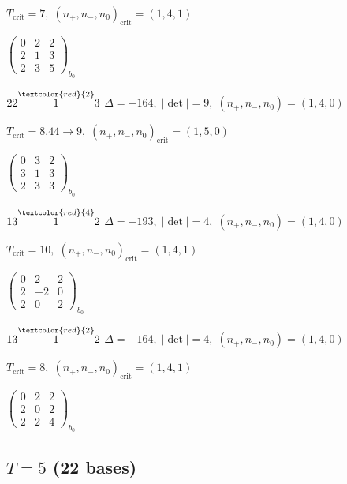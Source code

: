 \documentclass[10pt]{article}
\begin{document}
\hspace{1em}$T_{\text{crit}}=7,\; (n_+,n_-,n_0)_{\text{crit}}=(1,4,1)$

\hspace{2em}$\left(\begin{smallmatrix}0 & 2 & 2 \\ 2 & 1 & 3 \\ 2 & 3 & 5\end{smallmatrix}\right)_{\!b_0}$

\smallskip

$22\overset{\textcolor{red}{2}}{1}3$ \quad $\Delta=-164,\; |\det|=9,\; (n_+,n_-,n_0)=(1,4,0)$

\hspace{1em}$T_{\text{crit}}=8.44 \to 9,\; (n_+,n_-,n_0)_{\text{crit}}=(1,5,0)$

\hspace{2em}$\left(\begin{smallmatrix}0 & 3 & 2 \\ 3 & 1 & 3 \\ 2 & 3 & 3\end{smallmatrix}\right)_{\!b_0}$

\smallskip

$13\overset{\textcolor{red}{4}}{1}2$ \quad $\Delta=-193,\; |\det|=4,\; (n_+,n_-,n_0)=(1,4,0)$

\hspace{1em}$T_{\text{crit}}=10,\; (n_+,n_-,n_0)_{\text{crit}}=(1,4,1)$

\hspace{2em}$\left(\begin{smallmatrix}0 & 2 & 2 \\ 2 & -2 & 0 \\ 2 & 0 & 2\end{smallmatrix}\right)_{\!b_0}$

$13\overset{\textcolor{red}{2}}{1}2$ \quad $\Delta=-164,\; |\det|=4,\; (n_+,n_-,n_0)=(1,4,0)$

\hspace{1em}$T_{\text{crit}}=8,\; (n_+,n_-,n_0)_{\text{crit}}=(1,4,1)$

\hspace{2em}$\left(\begin{smallmatrix}0 & 2 & 2 \\ 2 & 0 & 2 \\ 2 & 2 & 4\end{smallmatrix}\right)_{\!b_0}$


\subsection*{$T = 5$ \quad (22 bases)}
\smallskip
\end{document}

